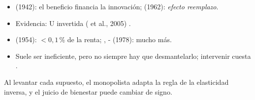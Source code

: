 \documentclass{article}
\begin{document}
\begin{columnas}
\begin{itemize}
\end{itemize}
\begin{itemize}
\item {} (1942): el beneficio financia la innovación;  (1962): \emph{efecto reemplazo}.
\item Evidencia: U invertida ( et al., 2005) .
\end{itemize}
\begin{itemize}
\item {} (1954): $<0{,}1$\,\% de la renta; , - (1978): mucho más.
\item Suele ser ineficiente, pero no siempre hay que desmantelarlo; intervenir cuesta .
\end{itemize}

\begin{ideaclave}
Al levantar cada supuesto, el monopolista adapta la regla de la elasticidad inversa, y el juicio de bienestar puede cambiar de signo.
\end{ideaclave}


\end{columnas}
\end{document}
